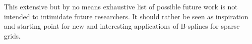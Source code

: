   

This extensive but by no means exhaustive list of possible future work is not
intended to intimidate future researchers.
It should rather be seen as inspiration and starting point
for new and interesting applications of B-splines for sparse grids.


\cleardoublepage
